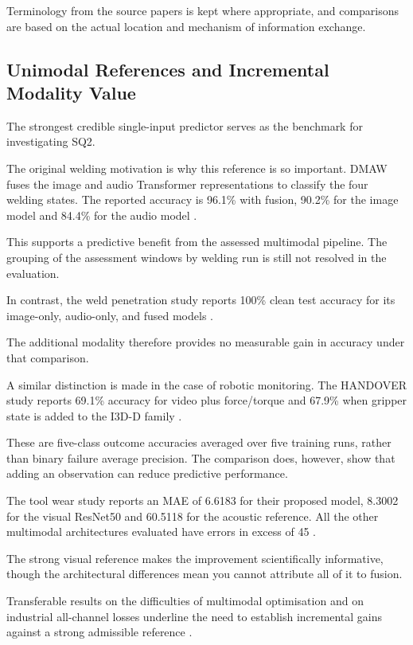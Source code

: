 Terminology from the source papers is kept where appropriate, and comparisons are based on the
actual location and mechanism of information exchange.

\subsection{Unimodal References and Incremental Modality Value}

The strongest credible single-input predictor serves as the benchmark for investigating SQ2.

The original welding motivation is why this reference is so important. DMAW fuses the image and
audio Transformer representations to classify the four welding states. The reported accuracy is
96.1\% with fusion, 90.2\% for the image model and 84.4\% for the audio model \parencite[PDF p.~7,
Table~III]{P003}.

This supports a predictive benefit from the assessed multimodal pipeline. The grouping of the
assessment windows by welding run is still not resolved in the evaluation.

In contrast, the weld penetration study reports 100\% clean test accuracy for its image-only,
audio-only, and fused models \parencite[Tables~1--3]{Hua2026Weld}.

The additional modality therefore provides no measurable gain in accuracy under that comparison.

A similar distinction is made in the case of robotic monitoring. The HANDOVER study reports 69.1\%
accuracy for video plus force/torque and 67.9\% when gripper state is added to the I3D-D family
\parencite[PDF p.~7, Table~III]{Thoduka2024Handover}.

These are five-class outcome accuracies averaged over five training runs, rather than binary failure
average precision. The comparison does, however, show that adding an observation can reduce
predictive performance.

The tool wear study reports an MAE of 6.6183 for their proposed model, 8.3002 for the visual
ResNet50 and 60.5118 for the acoustic reference. All the other multimodal architectures evaluated
have errors in excess of 45 \parencite[PDF p.~24, Table~1]{P045}.

The strong visual reference makes the improvement scientifically informative, though the
architectural differences mean you cannot attribute all of it to fusion.

Transferable results on the difficulties of multimodal optimisation and on industrial all-channel
losses underline the need to establish incremental gains against a strong admissible reference
\parencite{Wang2020What,Goodarzi2023Deep}.

